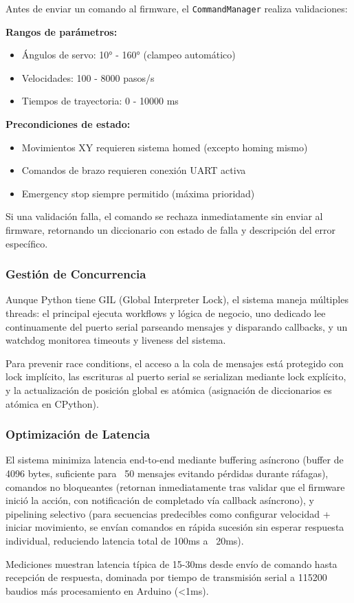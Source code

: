 Antes de enviar un comando al firmware, el \texttt{CommandManager} realiza validaciones:

\textbf{Rangos de parámetros:}
\begin{itemize}[label=$\bullet$]
    \item Ángulos de servo: 10° - 160° (clampeo automático)
    \item Velocidades: 100 - 8000 pasos/s
    \item Tiempos de trayectoria: 0 - 10000 ms
\end{itemize}

\textbf{Precondiciones de estado:}
\begin{itemize}[label=$\bullet$]
    \item Movimientos XY requieren sistema homed (excepto homing mismo)
    \item Comandos de brazo requieren conexión UART activa
    \item Emergency stop siempre permitido (máxima prioridad)
\end{itemize}

Si una validación falla, el comando se rechaza inmediatamente sin enviar al firmware, retornando un diccionario con estado de falla y descripción del error específico.

\subsubsection{Gestión de Concurrencia}

Aunque Python tiene GIL (Global Interpreter Lock), el sistema maneja múltiples threads: el principal ejecuta workflows y lógica de negocio, uno dedicado lee continuamente del puerto serial parseando mensajes y disparando callbacks, y un watchdog monitorea timeouts y liveness del sistema.

Para prevenir race conditions, el acceso a la cola de mensajes está protegido con lock implícito, las escrituras al puerto serial se serializan mediante lock explícito, y la actualización de posición global es atómica (asignación de diccionarios es atómica en CPython).

\subsubsection{Optimización de Latencia}

El sistema minimiza latencia end-to-end mediante buffering asíncrono (buffer de 4096 bytes, suficiente para ~50 mensajes evitando pérdidas durante ráfagas), comandos no bloqueantes (retornan inmediatamente tras validar que el firmware inició la acción, con notificación de completado vía callback asíncrono), y pipelining selectivo (para secuencias predecibles como configurar velocidad + iniciar movimiento, se envían comandos en rápida sucesión sin esperar respuesta individual, reduciendo latencia total de 100ms a ~20ms).

Mediciones muestran latencia típica de 15-30ms desde envío de comando hasta recepción de respuesta, dominada por tiempo de transmisión serial a 115200 baudios más procesamiento en Arduino (<1ms).

